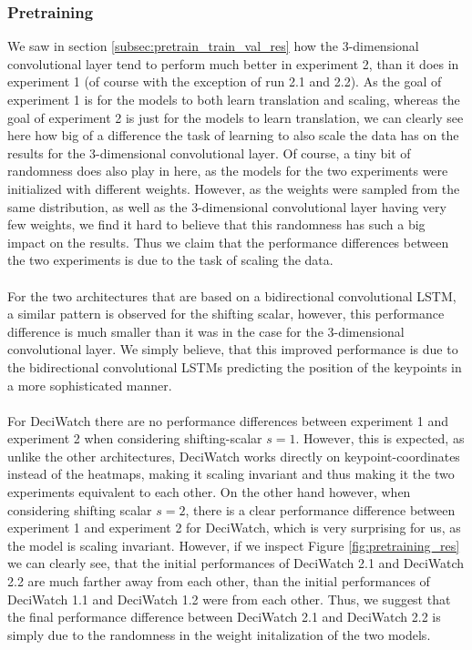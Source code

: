 \documentclass[./main.tex]{subfiles}
\begin{document}
\subsubsection{Pretraining}
We saw in section \ref{subsec:pretrain_train_val_res} how the 3-dimensional convolutional layer tend to perform much better in experiment 2, than it does in experiment 1 (of course with the exception of run 2.1 and 2.2). As the goal of experiment 1 is for the models to both learn translation and scaling, whereas the goal of experiment 2 is just for the models to learn translation, we can clearly see here how big of a difference the task of learning to also scale the data has on the results for the 3-dimensional convolutional layer. Of course, a tiny bit of randomness does also play in here, as the models for the two experiments were initialized with different weights. However, as the weights were sampled from the same distribution, as well as the 3-dimensional convolutional layer having very few weights, we find it hard to believe that this randomness has such a big impact on the results. Thus we claim that the performance differences between the two experiments is due to the task of scaling the data.
\\
\\
For the two architectures that are based on a bidirectional convolutional LSTM, a similar pattern is observed for the shifting scalar, however, this performance difference is much smaller than it was in the case for the 3-dimensional convolutional layer. We simply believe, that this improved performance is due to the bidirectional convolutional LSTMs predicting the position of the keypoints in a more sophisticated manner.
\\
\\
For DeciWatch there are no performance differences between experiment 1 and experiment 2 when considering shifting-scalar $s = 1$. However, this is expected, as unlike the other architectures, DeciWatch works directly on keypoint-coordinates instead of the heatmaps, making it scaling invariant and thus making it the two experiments equivalent to each other. On the other hand however, when considering shifting scalar $s = 2$, there is a clear performance difference between experiment 1 and experiment 2 for DeciWatch, which is very surprising for us, as the model is scaling invariant. However, if we inspect Figure \ref{fig:pretraining_res} we can clearly see, that the initial performances of DeciWatch 2.1 and DeciWatch 2.2 are much farther away from each other, than the initial performances of DeciWatch 1.1 and DeciWatch 1.2 were from each other. Thus, we suggest that the final performance difference between DeciWatch 2.1 and DeciWatch 2.2 is simply due to the randomness in the weight initalization of the two models.
\end{document}
